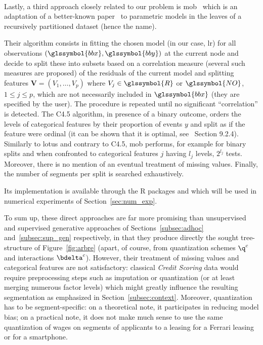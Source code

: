 \paragraph{} \label{par:mob}

Lastly, a third approach closely related to our problem is \gls{mob}~\cite{zeileis2008model} which is an adaptation of a better-known paper~\cite{hothorn2006unbiased} to parametric models in the leaves of a recursively partitioned dataset (hence the name).

Their algorithm consists in fitting the chosen model (in our case, \gls{lr}) for all observations $(\glssymbol{bbx},\glssymbol{bby})$ at the current node and decide to split these into subsets based on a correlation measure (several such measures are proposed) of the residuals of the current model and splitting features $\bm{V} = (V_1, \dots, V_p)$ where $V_j \in \glssymbol{R}$ or $\glssymbol{NO}$, $1 \leq j \leq p$, which are not necessarily included in $\glssymbol{bbx}$ (they are specified by the user). The procedure is repeated until no significant ``correlation'' is detected. The C4.5 algorithm, in presence of a binary outcome, orders the levels of categorical features by their proportion of events $y$ and split as if the feature were ordinal (it can be shown that it is optimal, see~\cite{friedman2001elements} Section 9.2.4).  Similarly to \gls{lotus} and contrary to C4.5, \gls{mob} performs, for example for binary splits and when confronted to categorical features $j$ having $l_j$ levels, $2^{l_j}$ tests. Moreover, there is no mention of an eventual treatment of missing values. Finally, the number of segments per split is searched exhaustively.

Its implementation is available through the \textsf{R} packages  and  which will be used in numerical experiments of Section~\ref{sec:num_exp}.

\medskip

To sum up, these direct approaches are far more promising than unsupervised and supervised generative approaches of Sections~\ref{subsec:adhoc} and~\ref{subsec:sup_gen} respectively, in that they produce directly the sought tree-structure of Figure~\ref{fig:arbre} (apart, of course, from quantization schemes $\q^c$ and interactions $\bdelta^c$). However, their treatment of missing values and categorical features are not satisfactory: classical \textit{Credit Scoring} data would require preprocessing steps such as imputation or quantization (or at least merging numerous factor levels) which might greatly influence the resulting segmentation as emphasized in Section~\ref{subsec:context}. Moreover, quantization has to be segment-specific: on a theoretical note, it participates in reducing model bias; on a practical note, it does not make much sense to use the same quantization of wages on segments of applicants to a leasing for a Ferrari leasing or for a smartphone.

